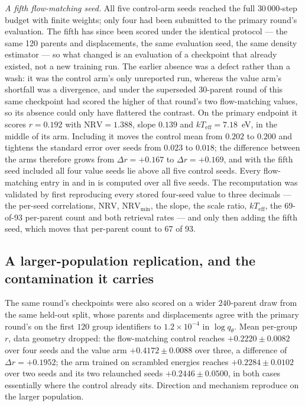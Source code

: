 \emph{A fifth flow-matching seed.} All five control-arm seeds reached the full
$30\,000$-step budget with finite weights; only four had been submitted to the primary
round's evaluation. The fifth has since been scored under the identical protocol --- the
same 120 parents and displacements, the same evaluation seed, the same density
estimator --- so what changed is an evaluation of a
checkpoint that already existed, not a new training run. The earlier absence was a
defect rather than a wash: it was the control arm's only unreported run, whereas the
value arm's shortfall was a divergence, and under the superseded 30-parent round of
 this same checkpoint had scored the higher of that round's two
flow-matching values, so its absence could only have flattered the contrast. On the
primary endpoint it scores $r = 0.192$ with $\mathrm{NRV} = 1.388$, slope $0.139$ and
$kT_{\mathrm{eff}} = 7.18$~eV, in the middle of its arm. Including it moves the control
mean from $0.202$ to $0.200$ and tightens the standard error over seeds from $0.023$ to
$0.018$; the difference between the arms therefore grows from $\Delta r = +0.167$ to
$\Delta r = +0.169$, and with the fifth seed included all four value seeds lie above
all five control seeds.
Every flow-matching entry in 
and in  is computed over all five seeds. The
recomputation was validated by first reproducing every stored four-seed value to three
decimals --- the per-seed correlations, $\mathrm{NRV}$, $\mathrm{NRV}_{\min}$, the slope,
the scale ratio, $kT_{\mathrm{eff}}$, the 69-of-93 per-parent count and both retrieval
rates --- and only then adding the fifth seed, which moves that per-parent count to 67
of 93.

\subsection{A larger-population replication, and the contamination it carries}
\label{app:n240}

The same round's checkpoints were also scored on a wider $240$-parent draw from the
same held-out split, whose parents and displacements agree with the primary round's on
the first $120$ group identifiers to $1.2\times10^{-4}$ in $\log q_\theta$. Mean
per-group $r$, data geometry dropped: the flow-matching control reaches
$+0.2220 \pm 0.0082$ over four seeds and the value arm $+0.4172 \pm 0.0088$ over three,
a difference of $\Delta r = +0.1952$; the arm trained on scrambled energies
reaches $+0.2284 \pm 0.0102$ over two seeds and its two relaunched seeds
$+0.2446 \pm 0.0500$, in both cases essentially where the control already sits.
Direction and mechanism reproduce on the larger population.


